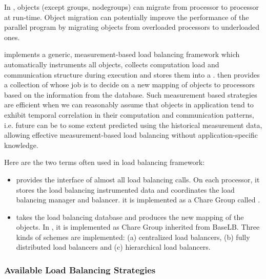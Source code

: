 \label{lbFramework}
\label{migrationlb}

In \charmpp{}, objects (except groups, nodegroups) can migrate from 
processor to processor at run-time. Object migration can potentially 
improve the performance of the parallel program by migrating objects from 
overloaded processors to underloaded ones. 


 \charmpp{} implements a generic, measurement-based load balancing framework
which automatically instruments all \charmpp{} objects, collects computation
load and communication structure during execution and stores them into a
. \charmpp{} then provides a collection of  whose job is to decide on a new mapping of objects to
processors based on the information from the database.  Such measurement based
strategies are efficient when we can reasonably assume that objects in
\charmpp{} application tend to exhibit temporal correlation in their
computation and communication patterns, i.e. future can be to some extent
predicted using the historical measurement data, allowing effective
measurement-based load balancing without application-specific knowledge.

Here are the two terms often used in \charmpp{} load balancing framework:
\begin{itemize}
%
\item {} provides the interface of almost all load
balancing calls. On each processor, it stores the load balancing instrumented
data and coordinates the load balancing manager and balancer. it is implemented
as a Chare Group called .
%
\item {} takes the load balancing database and
produces the new mapping of the objects. In \charmpp{}, it is implemented as
Chare Group inherited from BaseLB. Three kinds of schemes are implemented: (a)
centralized load balancers, (b) fully distributed load balancers and (c)
hierarchical load balancers.
%
\end{itemize}

\subsubsection{Available Load Balancing Strategies}

